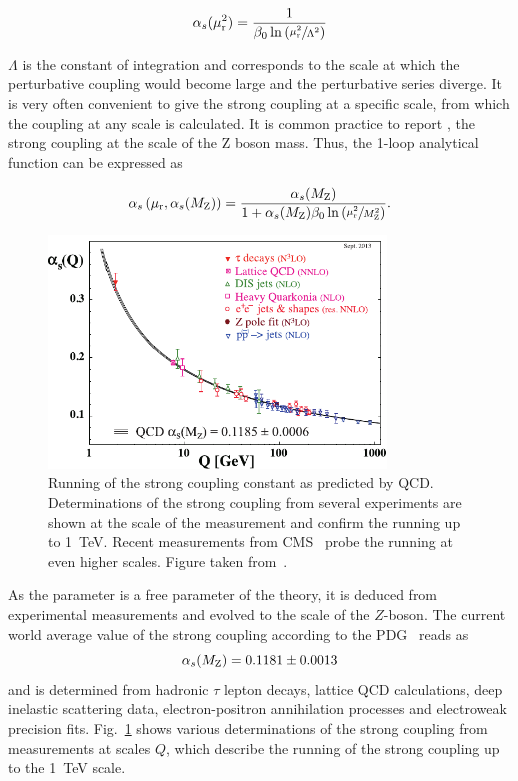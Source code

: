 \begin{equation*}
   \alpha_{s}(\mu_{\mathrm{r}}^2) = \frac{1}{\beta_0 \ln \left( \sfrac{\mu_{\mathrm{r}}^2}{\Lambda^2} \right)}
\end{equation*}

$\Lambda$ is the constant of integration and corresponds to the scale at which
the perturbative coupling would become large and the perturbative series
diverge. It is very often convenient to give the strong coupling at a specific
scale, from which the coupling at any scale is calculated. It is common practice
to report \asmz, the strong coupling at the scale of the Z boson mass. Thus, the
1-loop analytical function can be expressed as

\begin{equation*}
   \alpha_{s}\left(\mu_{\mathrm{r}}, \alpha_{s}(M_\mathrm{Z})\right) = \frac{\alpha_{s}(M_\mathrm{Z})}{1 + \alpha_{s}(M_\mathrm{Z})\beta_0 \ln
       \left( \sfrac{\mu_{\mathrm{r}}^2}{M_\mathrm{Z}^2} \right)}.
\end{equation*}

\begin{figure}[tbp] 
    \centering
    \includegraphics[width=0.8\textwidth]{figures/theoretical_foundations/as_running.pdf}\hfill
    \caption[Running of the strong coupling]{Running of the strong coupling
        constant as predicted by QCD. Determinations of the strong coupling from
        several experiments are shown at the scale of the measurement and
        confirm the running up to \SI{1}{\TeV}. Recent measurements from
        CMS~\cite{Khachatryan:2014waa,CMS:2014mna} probe the running at even
        higher scales. Figure taken from~\cite{Agashe:2014kda}.} 
    \label{fig:as_running} 
\end{figure}


As the parameter \as is a free parameter of the theory, it is deduced from
experimental measurements and evolved to the scale of the $Z$-boson. The current
world average value of the strong coupling according to the
PDG~\cite{Agashe:2014kda} reads as
%
\begin{equation*}
    \alpha_{s}(M_\mathrm{Z}) = 0.1181 \pm 0.0013
\end{equation*}
%
and is determined from hadronic $\tau$ lepton decays, lattice QCD calculations,
deep inelastic scattering data, electron-positron annihilation processes and
electroweak precision fits. Fig.~\ref{fig:as_running} shows various
determinations of the strong coupling from measurements at scales $Q$,
which describe the running of the strong coupling up to the \SI{1}{\TeV} scale.

